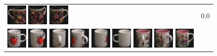 {\begin{figure}[p]
\begin{tabular}{m{11cm} | m{3cm} |}
\includegraphics[width=1cm]{coil/beeld-61.eps}
\includegraphics[width=1cm]{coil/beeld-63.eps}
\includegraphics[width=1cm]{coil/beeld-60.eps}
& {\scriptsize 0.0}
\\
\includegraphics[width=1cm]{coil/beeld-36.eps}
\includegraphics[width=1cm]{coil/beeld-39.eps}
\includegraphics[width=1cm]{coil/beeld-41.eps}
\includegraphics[width=1cm]{coil/beeld-40.eps}
\includegraphics[width=1cm]{coil/beeld-38.eps}
\includegraphics[width=1cm]{coil/beeld-37.eps}
\includegraphics[width=1cm]{coil/beeld-11.eps}
\includegraphics[width=1cm]{coil/beeld-10.eps}
\includegraphics[width=1cm]{coil/beeld-6.eps}

\end{tabular}
\end{figure}}

